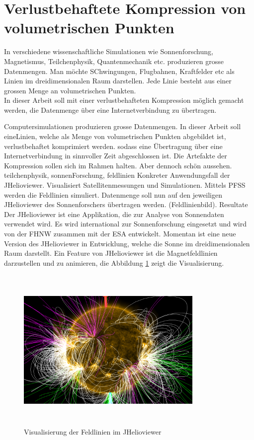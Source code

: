 \section{Verlustbehaftete Kompression von volumetrischen Punkten}
In verschiedene wissenschaftliche Simulationen wie Sonnenforschung, Magnetismus, Teilchenphysik, Quantenmechanik etc. produzieren grosse Datenmengen. Man möchte SChwingungen, Flugbahnen, Kraftfelder etc als Linien im dreidimensionalen Raum darstellen. Jede Linie besteht aus einer grossen Menge an volumetrischen Punkten.\\
In dieser Arbeit soll mit einer verlustbehafteten Kompression möglich gemacht werden, die Datenmenge über eine Internetverbindung zu übertragen. 

Computersimulationen produzieren grosse Datenmengen. 
In dieser Arbeit soll eineLinien, welche als Menge von volumetrischen Punkten abgebildet ist, verlustbehaftet komprimiert werden. sodass eine Übertragung über eine Internetverbindung in sinnvoller Zeit abgeschlossen ist. Die Artefakte der Kompression sollen sich im Rahmen halten. Aber dennoch schön aussehen.\\
[\baselineskip]
teilchenphysik, sonnenForschung, feldlinien Konkreter Anwendungsfall der JHelioviewer. Visualisiert Satellitenmessungen und Simulationen. Mittels PFSS werden die Feldlinien simuliert. Datenmenge soll nun auf den jeweiligen JHelioviewer des Sonnenforschers übertragen werden. (Feldlinienbild). Resultate\\
[\baselineskip]
Der JHelioviewer ist eine Applikation, die zur Analyse von Sonnendaten verwendet wird. Es wird international zur Sonnenforschung eingesetzt und wird von der FHNW zusammen mit der ESA entwickelt. Momentan ist eine neue Version des JHelioviewer in Entwicklung, welche die Sonne im dreidimensionalen Raum darstellt. Ein Feature von JHelioviewer ist die Magnetfeldlinien darzustellen und zu animieren, die Abbildung \ref{einleitung::feldlinien} zeigt die Visualisierung.
\begin{figure}[!htbp]
\center
	\includegraphics[width=0.8\textwidth,height=8cm,keepaspectratio]{./pictures/einleitung/fieldLines.png}
	\caption{Visualisierung der Feldlinien im JHelioviewer}
	\label{einleitung::feldlinien}
\end{figure}

